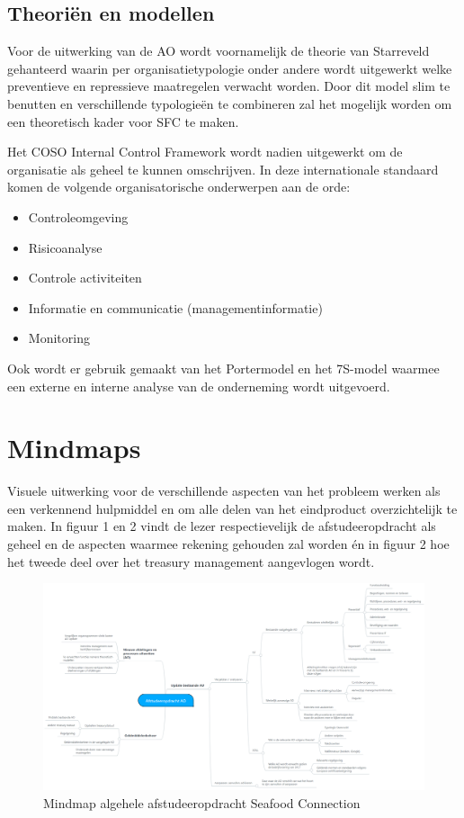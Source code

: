 \documentclass[10pt,a4paper,twoside]{report}
\begin{document}
\section{Theoriën en modellen}
Voor de uitwerking van de AO wordt voornamelijk de theorie van Starreveld gehanteerd waarin per organisatietypologie onder andere wordt uitgewerkt welke preventieve en repressieve maatregelen verwacht worden. Door dit model slim te benutten en verschillende typologieën te combineren zal het mogelijk worden om een theoretisch kader voor SFC te maken. 

Het COSO Internal Control Framework wordt nadien uitgewerkt om de organisatie als geheel te kunnen omschrijven. In deze internationale standaard komen de volgende organisatorische onderwerpen aan de orde:
\begin{itemize}
    \item Controleomgeving
    \item Risicoanalyse
    \item Controle activiteiten
    \item Informatie en communicatie (managementinformatie)
    \item Monitoring
\end{itemize}
Ook wordt er gebruik gemaakt van het Portermodel en het 7S-model waarmee een externe en interne analyse van de onderneming wordt uitgevoerd.

\chapter{Mindmaps}
Visuele uitwerking voor de verschillende aspecten van het probleem werken als een verkennend hulpmiddel en om alle delen van het eindproduct overzichtelijk te maken. In figuur 1 en 2 vindt de lezer respectievelijk de afstudeeropdracht als geheel en de aspecten waarmee rekening gehouden zal worden én in figuur 2 hoe het tweede deel over het treasury management aangevlogen wordt. 

\begin{figure}
    \centering
    \includegraphics[angle=90,height=0.95\textheight]{afstudeeropdracht}
    \caption{Mindmap algehele afstudeeropdracht Seafood Connection}
    \label{fig:mmopdracht}
\end{figure}
\end{document}
